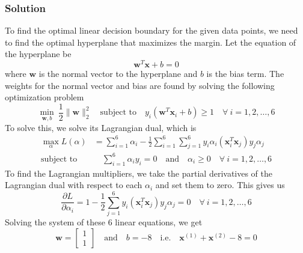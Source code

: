 \documentclass[12pt]{article}
\begin{document}
    \subsubsection*{Solution}
    To find the optimal linear decision boundary for the given data points, we need to find
    the optimal hyperplane that maximizes the margin. Let the equation of the hyperplane be
    \begin{equation}
        \label{eq:hyperplane}
        \mathbf{w}^T \mathbf{x} + b = 0
    \end{equation}
    where $\mathbf{w}$ is the normal vector to the hyperplane and $b$ is the bias term. The
    weights for the normal vector and bias are found by solving the following optimization problem
    \begin{equation}
        \label{eq:opt}
        \min_{\mathbf{w}, b} \ \frac{1}{2} \lVert \mathbf{w} \rVert_{2}^{2} \quad \text{subject to}
        \quad y_{i} (\mathbf{w}^T \mathbf{x}_{i} + b) \geq 1 \quad \forall \ i = 1, 2, \dots, 6
    \end{equation}
    To solve this, we solve its Lagrangian dual, which is
    \begin{align}
        \label{eq:dual}
        \max_{\alpha} L(\alpha) &= \sum_{i=1}^{6} \alpha_{i} - \frac{1}{2} \sum_{i=1}^{6} \sum_{j=1}^{6}
        y_{i} \alpha_{i} (\mathbf{x}_{i}^T \mathbf{x}_{j}) y_{j} \alpha_{j} \\
        \text{subject to} &\quad \sum_{i=1}^{6} \alpha_{i} y_{i} = 0 \quad \text{and} \quad \alpha_{i} \geq 0
        \quad \forall \ i = 1, 2, \dots, 6 \nonumber
    \end{align}
    To find the Lagrangian multipliers, we take the partial derivatives of the Lagrangian dual
    with respect to each $\alpha_{i}$ and set them to zero. This gives us
    \begin{equation}
        \label{eq:partial}
        \frac{\partial L}{\partial \alpha_{i}} = 1 - \frac{1}{2} \sum_{j=1}^{6} y_{i} (\mathbf{x}_{i}^T \mathbf{x}_{j}) y_{j} \alpha_{j} = 0
        \quad \forall \ i = 1, 2, \dots, 6
    \end{equation}
    Solving the system of these 6 linear equations, we get
    \begin{equation}
        \label{eq:optimal}
        \mathbf{w} = \begin{bmatrix} 1 \\ 1 \end{bmatrix} \quad \text{and} \quad b = -8 \quad
        \text{i.e.} \quad \mathbf{x}^{(1)} + \mathbf{x}^{(2)} - 8 = 0
    \end{equation}
\end{document}
